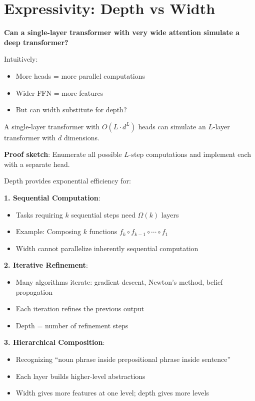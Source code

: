 \section{Expressivity: Depth vs Width}

\begin{remark}
    \textbf{Can a single-layer transformer with very wide attention simulate a deep transformer?}

    Intuitively:
    \begin{itemize}
        \item More heads = more parallel computations
        \item Wider FFN = more features
        \item But can width substitute for depth?
    \end{itemize}
\end{remark}

\begin{theorem}
    A single-layer transformer with $O(L \cdot d^L)$ heads can simulate an $L$-layer transformer with $d$ dimensions.

    \textbf{Proof sketch}: Enumerate all possible $L$-step computations and implement each with a separate head.
\end{theorem}

\begin{remark}
    Depth provides exponential efficiency for:

    \textbf{1. Sequential Computation}:
    \begin{itemize}
        \item Tasks requiring $k$ sequential steps need $\Omega(k)$ layers
        \item Example: Composing $k$ functions $f_k \circ f_{k-1} \circ \cdots \circ f_1$
        \item Width cannot parallelize inherently sequential computation
    \end{itemize}

    \textbf{2. Iterative Refinement}:
    \begin{itemize}
        \item Many algorithms iterate: gradient descent, Newton's method, belief propagation
        \item Each iteration refines the previous output
        \item Depth = number of refinement steps
    \end{itemize}

    \textbf{3. Hierarchical Composition}:
    \begin{itemize}
        \item Recognizing ``noun phrase inside prepositional phrase inside sentence''
        \item Each layer builds higher-level abstractions
        \item Width gives more features at one level; depth gives more levels
    \end{itemize}
\end{remark}

